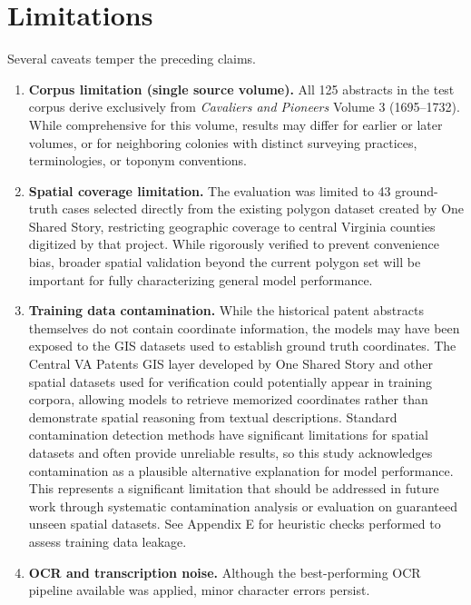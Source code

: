 \section{Limitations}\label{limitations}

Several caveats temper the preceding claims.

\begin{enumerate}
\def\labelenumi{\arabic{enumi}.}
\item
  \textbf{Corpus limitation (single source volume).} All 125 abstracts
  in the test corpus derive exclusively from \emph{Cavaliers and
  Pioneers} Volume 3 (1695--1732). While comprehensive for this volume,
  results may differ for earlier or later volumes, or for neighboring
  colonies with distinct surveying practices, terminologies, or toponym
  conventions.
\item
  \textbf{Spatial coverage limitation.} The evaluation was limited to 43
  ground-truth cases selected directly from the existing polygon dataset
  created by One Shared Story, restricting geographic coverage to
  central Virginia counties digitized by that project. While rigorously
  verified to prevent convenience bias, broader spatial validation
  beyond the current polygon set will be important for fully
  characterizing general model performance.
\item
  \textbf{Training data contamination.} While the historical patent
  abstracts themselves do not contain coordinate information, the models
  may have been exposed to the GIS datasets used to establish ground
  truth coordinates. The Central VA Patents GIS layer developed by One
  Shared Story \citep{central_va_patents_gis} and other spatial datasets
  used for verification could potentially appear in training corpora,
  allowing models to retrieve memorized coordinates rather than
  demonstrate spatial reasoning from textual descriptions. Standard
  contamination detection methods have significant limitations for
  spatial datasets and often provide unreliable results, so this study
  acknowledges contamination as a plausible alternative explanation for
  model performance. This represents a significant limitation that
  should be addressed in future work through systematic contamination
  analysis or evaluation on guaranteed unseen spatial datasets. See
  Appendix E for heuristic checks performed to assess training data
  leakage.
\item
  \textbf{OCR and transcription noise.} Although the best-performing OCR
  pipeline available was applied, minor character errors persist.

\end{enumerate}

